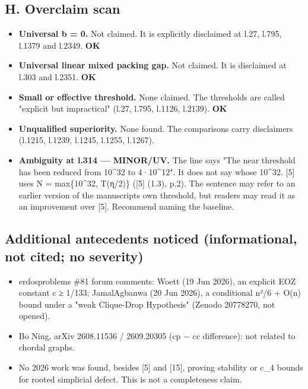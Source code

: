 \documentclass[
]{article}
\providecommand{\tightlist}{%
  \setlength{\itemsep}{0pt}\setlength{\parskip}{0pt}}
\begin{document}
\subsection{H. Overclaim scan}\label{h-overclaim-scan}

\begin{itemize}
\tightlist
\item
  \textbf{Universal b = 0.} Not claimed. It is explicitly disclaimed at
  l.27, l.795, l.1379 and l.2349. \textbf{OK}
\item
  \textbf{Universal linear mixed packing gap.} Not claimed. It is
  disclaimed at l.303 and l.2351. \textbf{OK}
\item
  \textbf{Small or effective threshold.} None claimed. The thresholds
  are called "explicit but impractical" (l.27, l.795, l.1126, l.2139).
  \textbf{OK}
\item
  \textbf{Unqualified superiority.} None found. The comparisons carry
  disclaimers (l.1215, l.1239, l.1245, l.1255, l.1267).
\item
  \textbf{Ambiguity at l.314 --- MINOR/UV.} The line says "The near
  threshold has been reduced from 10\^{}32 to 4·10\^{}12". It does not
  say whose 10\^{}32. {[}5{]} uses N = max\{10\^{}32, T(η/2)\} ({[}5{]}
  (1.3), p.2). The sentence may refer to an earlier version of the
  manuscript\textquotesingle s own threshold, but readers may read it as
  an improvement over {[}5{]}. Recommend naming the baseline.
\end{itemize}

\subsection{Additional antecedents noticed (informational, not cited; no
severity)}\label{additional-antecedents-noticed-informational-not-cited-no-severity}

\begin{itemize}
\tightlist
\item
  erdosproblems \#81 forum comments: Woett (19 Jun 2026), an explicit
  EOZ constant c ≥ 1/133; JamalAgbanwa (20 Jun 2026), a conditional n²/6
  + O(n) bound under a "weak Clique-Drop Hypothesis" (Zenodo 20778270,
  not opened).
\item
  Bo Ning, arXiv 2608.11536 / 2609.20305 (cp − cc difference): not
  related to chordal graphs.
\item
  No 2026 work was found, besides {[}5{]} and {[}15{]}, proving
  stability or c\_4 bounds for rooted simplicial defect. This is not a
  completeness claim.
\end{itemize}
\end{document}
